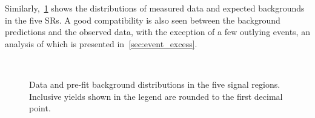 Similarly,~\cref{fig:pre_fit_SR} shows the \mhnl distributions of measured data and expected backgrounds in the five SRs. A good compatibility is also seen between the background predictions and the observed data, with the exception of a few outlying events, an analysis of which is presented in~\cref{sec:event_excess}.

\begin{figure}[!htbp]
    \centering
    \\
    \caption{Data and pre-fit background \mhnl distributions in the five signal regions. Inclusive yields shown in the legend are rounded to the first decimal point.}
    \label{fig:pre_fit_SR}
\end{figure}

